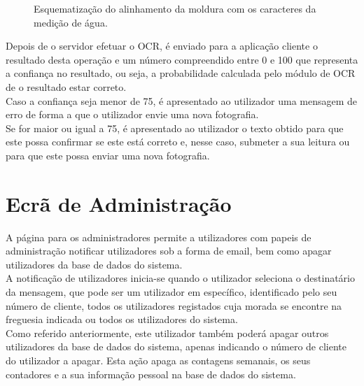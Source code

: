 \begin{figure}[h!]
\begin{center}
\caption{Esquematização do alinhamento da moldura com os caracteres da medição de água.}
\label{fig:moldura}
\end{center}
\end{figure}

Depois de o servidor efetuar o OCR, é enviado para a aplicação cliente o resultado desta operação e um número compreendido entre 0 e 100 que representa a confiança no resultado, ou seja, a probabilidade calculada pelo módulo de OCR de o resultado estar correto.\\
Caso a confiança seja menor de 75, é apresentado ao utilizador uma mensagem de erro de forma a que o utilizador envie uma nova fotografia.\\
Se for maior ou igual a 75, é apresentado ao utilizador o texto obtido para que este possa confirmar se este está correto e, nesse caso, submeter a sua leitura ou para que este possa enviar uma nova fotografia.\\

\section{Ecrã de Administração} \label{ecra:admin} %
A página para os administradores permite a utilizadores com papeis de administração notificar utilizadores sob a forma de email, bem como apagar utilizadores da base de dados do sistema.\\
A notificação de utilizadores inicia-se quando o utilizador seleciona o destinatário da mensagem, que pode ser um utilizador em específico, identificado pelo seu número de cliente, todos os utilizadores registados cuja morada se encontre na freguesia indicada ou todos os utilizadores do sistema.\\
Como referido anteriormente, este utilizador também poderá apagar outros utilizadores da base de dados do sistema, apenas indicando o número de cliente do utilizador a apagar. Esta ação apaga as contagens semanais, os seus contadores e a sua informação pessoal na base de dados do sistema.




















